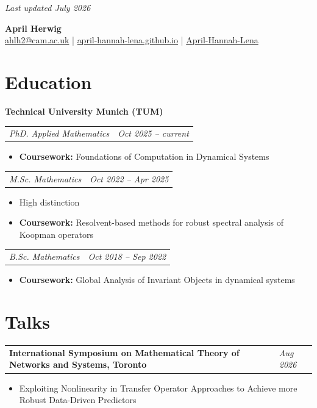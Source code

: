 \documentclass[10pt,a4paper]{article}
\makeatletter
\newcommand{\datedentry}[2]{%
    \begin{tabularx}{\textwidth}{@{}X>{\raggedleft\arraybackslash}p{4cm}@{}}
        #1 & \textit{#2}
    \end{tabularx}%
}
\makeatother
\begin{document}
%
%
\begin{flushright}
    \small\color{gray}\textit{Last updated July 2026}
\end{flushright}

\vspace{-1.2em}
\begin{center}
    {\fontsize{24pt}{26pt}\selectfont\bfseries April Herwig}\\[0.3cm]
    \href{mailto:ahlh2@cam.ac.uk}{ahlh2@cam.ac.uk}
    \quad | \quad
    \href{https://april-hannah-lena.github.io/}{april-hannah-lena.github.io}
    \quad | \quad
    \href{https://github.com/April-Hannah-Lena}{April-Hannah-Lena}
\end{center}

\section{Education}

\textbf{Technical University Munich (TUM)}

\datedentry{\textit{PhD. Applied Mathematics}}{Oct 2025 -- current}
\begin{itemize}
    \item \textbf{Coursework:} Foundations of Computation in Dynamical Systems
\end{itemize}

\datedentry{\textit{M.Sc. Mathematics}}{Oct 2022 -- Apr 2025}
\begin{itemize}
    \item High distinction
    \item \textbf{Coursework:} Resolvent-based methods for robust spectral analysis of Koopman operators
\end{itemize}

\medskip
\datedentry{\textit{B.Sc. Mathematics}}{Oct 2018 -- Sep 2022}
\begin{itemize}
    \item \textbf{Coursework:} Global Analysis of Invariant Objects in dynamical systems
\end{itemize}

\section{Talks}

\datedentry{\textbf{International Symposium on Mathematical Theory of Networks and Systems, Toronto}}{Aug 2026}
\begin{itemize}
    \item Exploiting Nonlinearity in Transfer Operator Approaches to Achieve more Robust Data-Driven Predictors
\end{itemize}
\end{document}

